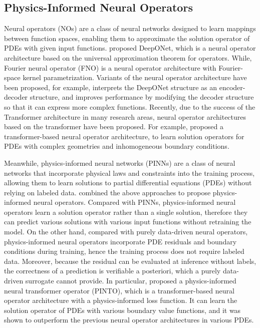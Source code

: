 \subsection{Physics-Informed Neural Operators}

Neural operators (NOs) \cite{DeepONet,FNO,BENO,Transolver,LNO} are a class of neural networks 
designed to learn mappings between function spaces, enabling them to approximate 
the solution operator of PDEs with given input functions.
\cite{DeepONet} proposed DeepONet, which is a neural operator architecture 
based on the universal approximation theorem \cite{UATO} for operators. 
While, Fourier neural operator (FNO) \cite{FNO} is a neural operator architecture
with Fourier-space kernel parametrization.
Variants of the neural operator architecture \cite{NOMAD} have been proposed, for example, 
\cite{NOMAD} interprets the DeepONet structure as an encoder-decoder structure, 
and improves performance by modifying the decoder structure so that it can express 
more complex functions.
Recently, due to the success of the Transformer architecture \cite{transformer} 
in many research areas, neural operator architectures based on the transformer have been proposed.
For example, \cite{BENO} proposed a transformer-based neural operator architecture,
to learn solution operators for PDEs with complex geometries and inhomogeneous boundary conditions.

Meanwhile, physics-informed neural networks (PINNs) \cite{PINNs} are a class of neural networks 
that incorporate physical laws and constraints into the training process,
allowing them to learn solutions to partial differential equations 
(PDEs) without relying on labeled data.
\cite{PIDeepONet,PIFNO} combined the above approaches to propose 
physics-informed neural operators.
Compared with PINNs, physics-informed neural operators learn a solution operator rather than a single solution,
therefore they can predict various solutions with various 
input functions without retraining the model.
On the other hand, compared with purely data-driven neural operators, 
physics-informed neural operators incorporate
PDE residuals and boundary conditions during training, hence the training process
does not require labeled data. Moreover, because the residual can be evaluated at
inference without labels, the correctness of a prediction is verifiable a
posteriori, which a purely data-driven surrogate cannot provide.
In particular, \cite{PINTO} proposed a physics-informed neural transformer operator (PINTO), 
which is a transformer-based neural operator architecture with a physics-informed loss function.
It can learn the solution operator of PDEs with various boundary value functions, and 
it was shown to outperform the previous neural operator architectures in various PDEs.

